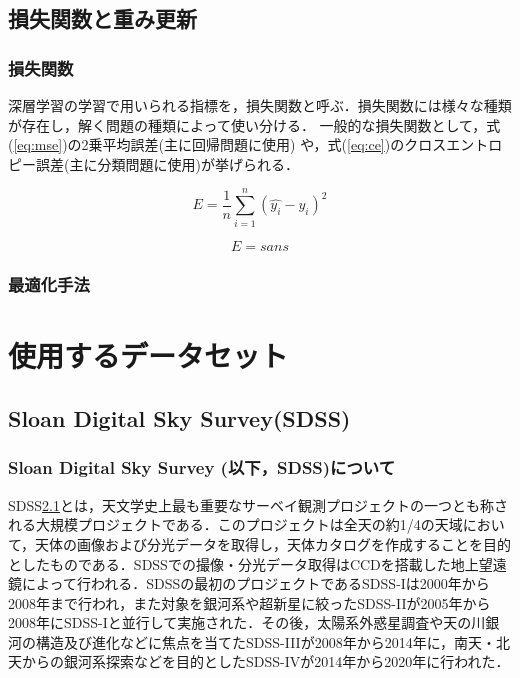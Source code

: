 \documentclass[a4j, 11pt]{jreport}
\begin{document}
\section{損失関数と重み更新}
\subsection{損失関数}
深層学習の学習で用いられる指標を，損失関数と呼ぶ．損失関数には様々な種類が存在し，解く問題の種類によって使い分ける．
一般的な損失関数として，式(\ref{eq:mse})の2乗平均誤差(主に回帰問題に使用) や，式(\ref{eq:ce})のクロスエントロピー誤差(主に分類問題に使用)が挙げられる．

\begin{equation}
	E = \frac{1}{n} \sum_{i=1}^{n} (\hat{y_i} - y_i)^2
	\label{eq:mse}
\end{equation}

\begin{equation}
	E = sans
	\label{eq:ce}
\end{equation}

\subsection{最適化手法}


\newpage
\chapter{使用するデータセット}
\section{Sloan Digital Sky Survey(SDSS)}
\subsection*{Sloan Digital Sky Survey (以下，SDSS)について}
SDSS\ref{}とは，天文学史上最も重要なサーベイ観測プロジェクトの一つとも称される大規模プロジェクトである．このプロジェクトは全天の約1/4の天域において，天体の画像および分光データを取得し，天体カタログを作成することを目的としたものである．SDSSでの撮像・分光データ取得はCCDを搭載した地上望遠鏡によって行われる．SDSSの最初のプロジェクトであるSDSS-Iは2000年から2008年まで行われ，また対象を銀河系や超新星に絞ったSDSS-IIが2005年から2008年にSDSS-Iと並行して実施された．その後，太陽系外惑星調査や天の川銀河の構造及び進化などに焦点を当てたSDSS-IIIが2008年から2014年に，南天・北天からの銀河系探索などを目的としたSDSS-IVが2014年から2020年に行われた．
\end{document}
